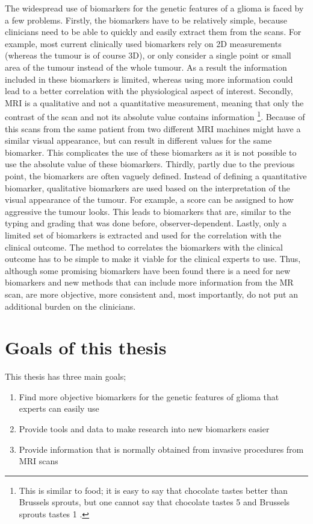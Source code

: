 The widespread use of biomarkers for the genetic features of a glioma is faced by a few problems.
Firstly, the biomarkers have to be relatively simple, because clinicians need to be able to quickly and easily extract them from the scans.
For example, most current clinically used biomarkers rely on 2D measurements (whereas the tumour is of course 3D), or only consider a single point or small area of the tumour instead of the whole tumour.
As a result the information included in these biomarkers is limited, whereas using more information could lead to a better correlation with the physiological aspect of interest.
Secondly, \gls{MRI} is a qualitative and not a quantitative measurement, meaning that only the contrast of the scan and not its absolute value contains information \footnote{This is similar to food; it is easy to say that chocolate tastes better than Brussels sprouts, but one cannot say that chocolate tastes 5  and Brussels sprouts tastes 1 .}.
Because of this scans from the same patient from two different \gls{MRI} machines might have a similar visual appearance, but can result in different values for the same biomarker.
This complicates the use of these biomarkers as it is not possible to use the absolute value of these biomarkers.
Thirdly, partly due to the previous point, the biomarkers are often vaguely defined.
Instead of defining a quantitative biomarker, qualitative biomarkers are used based on the interpretation of the visual appearance of the tumour.
For example, a score can be assigned to how aggressive the tumour looks.
This leads to biomarkers that are, similar to the typing and grading that was done before, observer-dependent.
Lastly, only a limited set of biomarkers is extracted and used for the correlation with the clinical outcome.
The method to correlates the biomarkers with the clinical outcome has to be simple to make it viable for the clinical experts to use.
Thus, although some promising biomarkers have been found there is a need for new biomarkers and new methods that can include more information from the \gls{MR} scan, are more objective, more consistent and, most importantly, do not put an additional burden on the clinicians.


\section{Goals of this thesis}

This thesis has three main goals;

\begin{enumerate}
\item Find more objective biomarkers for the genetic features of glioma that experts can easily use
\item Provide tools and data to make research into new biomarkers easier
\item Provide information that is normally obtained from invasive procedures from \gls{MRI} scans
\end{enumerate}

